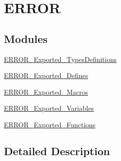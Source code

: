 \hypertarget{group___e_r_r_o_r}{}\section{E\+R\+R\+OR}
\label{group___e_r_r_o_r}
\subsection*{Modules}
\begin{DoxyCompactItemize}
\item 
\mbox{\hyperlink{group___e_r_r_o_r___exported___types_definitions}{E\+R\+R\+O\+R\+\_\+\+Exported\+\_\+\+Types\+Definitions}}
\item 
\mbox{\hyperlink{group___e_r_r_o_r___exported___defines}{E\+R\+R\+O\+R\+\_\+\+Exported\+\_\+\+Defines}}
\item 
\mbox{\hyperlink{group___e_r_r_o_r___exported___macros}{E\+R\+R\+O\+R\+\_\+\+Exported\+\_\+\+Macros}}
\item 
\mbox{\hyperlink{group___e_r_r_o_r___exported___variables}{E\+R\+R\+O\+R\+\_\+\+Exported\+\_\+\+Variables}}
\item 
\mbox{\hyperlink{group___e_r_r_o_r___exported___functions}{E\+R\+R\+O\+R\+\_\+\+Exported\+\_\+\+Functions}}
\end{DoxyCompactItemize}


\subsection{Detailed Description}
